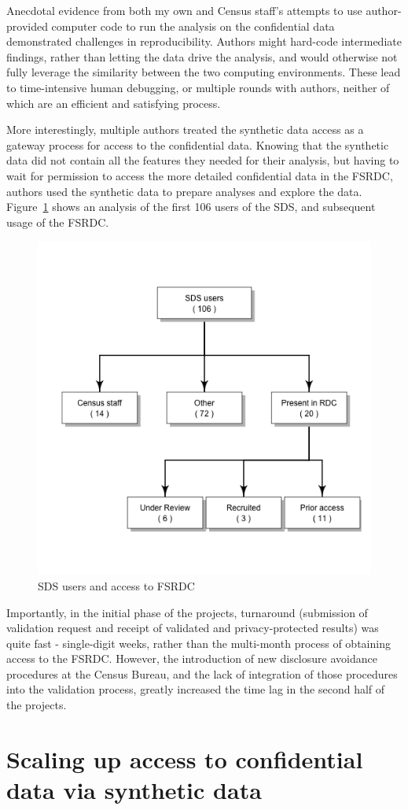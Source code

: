 \documentclass[12pt]{article}
\begin{document}
Anecdotal evidence from both my own and Census staff's attempts to use author-provided computer code to run the analysis on the confidential data demonstrated challenges in reproducibility. Authors might hard-code intermediate findings, rather than letting the data drive the analysis, and would otherwise not fully leverage the similarity between the two computing environments. These lead to time-intensive human debugging, or multiple rounds with authors, neither of which are an efficient and satisfying process. 

More interestingly, multiple authors treated the synthetic data access as a gateway process for access to the confidential data. Knowing that the synthetic data did not contain all the features they needed for their analysis, but having to wait for permission to access the more detailed confidential data in the \ac{FSRDC}, authors used the synthetic data to prepare analyses and explore the data. Figure~\ref{fig:useRDC} shows an  analysis of the first 106 users of the SDS, and subsequent usage of the \ac{FSRDC}. 

\begin{figure}
    \centering
    \includegraphics[width=0.5\linewidth]{figs/useRDCgraph.png}
    \caption{SDS users and access to FSRDC}
    \label{fig:useRDC}
\end{figure}

Importantly, in the initial phase of the projects, turnaround (submission of validation request and receipt of validated and privacy-protected results) was quite fast - single-digit weeks, rather than the multi-month process of obtaining access to the \ac{FSRDC}. However, the introduction of new disclosure avoidance procedures at the Census Bureau, and the lack of integration of those procedures into the validation process, greatly increased the time lag in the second half of the projects.

\section{Scaling up access to confidential data via synthetic data}
\end{document}
